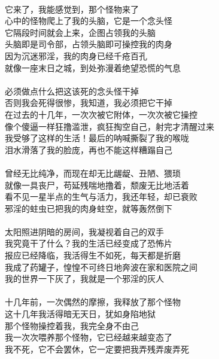 \begin{adjustwidth}{-2.5em}{-2.5em}
    \begin{poem}[恶念附体]
        \begin{multicols}{2}
            \centering~\\
            它来了，我能感觉到，那个怪物来了 \\ 心中的怪物爬上了我的头脑，它是一个念头怪 \\ 它隔段时间就会上来，企图占领我的头脑 \\ 头脑即是司令部，占领头脑即可操控我的肉身 \\ 因为沉迷邪淫，我的肉身已经千疮百孔 \\ 就像一座末日之城，到处弥漫着绝望恐慌的气息 \\~\\
            必须做点什么把这该死的念头怪干掉 \\ 否则我会死得很惨，我知道，我必须把它干掉 \\ 在过去的十几年，一次次被它附体，一次次被它操控 \\ 像个傻逼一样狂撸滥泄，疯狂掏空自己，射完才清醒过来 \\ 我受够了这样的生活！最后的呐喊撕裂了我的喉咙 \\ 泪水滑落了我的脸庞，再也不能这样糟蹋自己 \\~\\
            曾经无比纯净，而现在却无比龌龊、丑陋、猥琐 \\ 就像一具丧尸，苟延残喘地撸着，颓废无比地活着 \\ 看不见一星半点的生气与活力，我还年轻，却已衰败 \\ 邪淫的蛀虫已把我的肉身蛀空，就等轰然倒下 \\~\\
            太阳照进阴暗的房间，我凝视着自己的双手 \\ 我究竟干了什么？我的生活已经变成了恐怖片 \\ 报应已经降临，我活得生不如死，每天都是折磨 \\ 我成了药罐子，惶惶不可终日地奔波在家和医院之间 \\ 我的世界一下灰了，我就是一个邪淫的灰人 \\~\\
            十几年前，一次偶然的摩擦，我释放了那个怪物 \\ 这十几年我活得暗无天日，犹如身陷地狱 \\ 那个怪物操控着我，我完全身不由己 \\ 我一次次喂养那个怪物，它已经越来越变态了 \\ 我不死，它不会罢休，它一定要把我弄残弄废弄死 \\~\\

\end{multicols}
\end{poem}
\end{adjustwidth}
